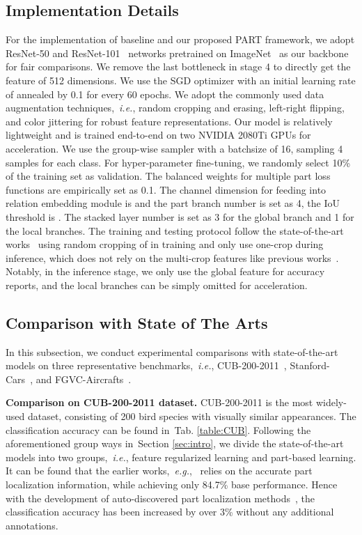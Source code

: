 \documentclass[journal]{IEEEtran}
\def\ie{{\em i.e.}}
\def\eg{{\em e.g.}}
\newcommand{\tabref}[1]{Tab. \ref{#1}}
\newcommand{\secref}[1]{Section \ref{#1}}
\begin{document}
\subsection{Implementation Details}\label{sec:expimplementaion}
For the implementation of baseline and our proposed PART framework, we adopt ResNet-50 and ResNet-101~\cite{he2016deep} networks pretrained on ImageNet~\cite{deng2009imagenet} as our backbone for fair comparisons. We remove the last bottleneck in stage 4 to directly get the feature of 512 dimensions. We use the SGD optimizer with an initial learning rate of  annealed by 0.1 for every 60 epochs. We adopt the commonly used data augmentation techniques,~\ie, random cropping and erasing, left-right flipping, and color jittering for robust feature representations. Our model is relatively lightweight and is trained end-to-end on two NVIDIA 2080Ti GPUs for acceleration. We use the group-wise sampler with a batchsize of 16, sampling 4 samples for each class.
For hyper-parameter fine-tuning, we randomly select 10\% of the training set as validation.
The balanced weights  for multiple part loss functions are empirically set as 0.1.
The channel dimension for feeding into relation embedding module is  and the part branch number is set as 4, the IoU threshold is . The stacked layer number  is set as 3 for the global branch and 1 for the local branches. The training and testing protocol follow the state-of-the-art works~\cite{luo2019cross,chen2019destruction,zhang2020learning} using random cropping of  in training and only use one-crop during inference, which does not rely on the multi-crop features like previous works~\cite{fu2017look,zheng2017learning,yang2018learning}. Notably, in the inference stage, we only use the global feature for accuracy reports, and the local branches can be simply omitted for acceleration.




\subsection{Comparison with State of The Arts}\label{sec:expcomp}
In this subsection, we conduct experimental comparisons with state-of-the-art models on three representative benchmarks,~\ie, CUB-200-2011~\cite{wah2011caltech}, Stanford-Cars~\cite{krause20133d}, and FGVC-Aircrafts~\cite{maji2013fine}.

\textbf{Comparison on CUB-200-2011 dataset.} CUB-200-2011 is the most widely-used dataset, consisting of 200 bird species with visually similar appearances. The classification accuracy can be found in~\tabref{table:CUB}. Following the aforementioned group ways in~\secref{sec:intro}, we divide the state-of-the-art models into two groups,~\ie, feature regularized learning and part-based learning. It can be found that the earlier works,~\eg,~\cite{krause2015fine,liu2016fully} relies on the accurate part localization information, while achieving only 84.7\% base performance. Hence with the development of auto-discovered part localization methods~\cite{zheng2017learning,yang2018learning}, the classification accuracy has been increased by over 3\% without any additional annotations.
\end{document}
